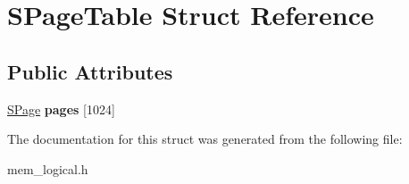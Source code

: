 \hypertarget{struct_s_page_table}{}\section{S\+Page\+Table Struct Reference}
\label{struct_s_page_table}
\subsection*{Public Attributes}
\begin{DoxyCompactItemize}
\item 
\mbox{\label{struct_s_page_table_a256c8fa7339dc343566baf20f8fc2902}} 
\hyperlink{struct_s_page}{S\+Page} {\bfseries pages} \mbox{[}1024\mbox{]}
\end{DoxyCompactItemize}


The documentation for this struct was generated from the following file\+:\begin{DoxyCompactItemize}
\item 
mem\+\_\+logical.\+h\end{DoxyCompactItemize}
